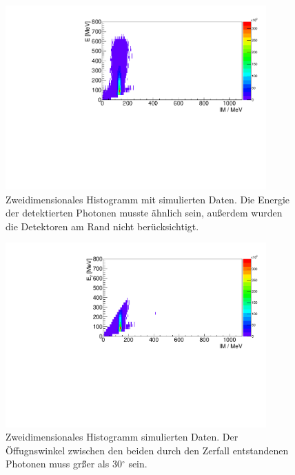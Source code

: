 \documentclass[a4paper,11pt,oneside,final,german,openbib,pdftex]{scrbook}
\begin{document}
{\begin{appendix}
\begin{figure}[h!]
	\begin{center}
		\includegraphics[width=100mm]{NewCalib/20171904Sim30DegreeCut}
		\caption[Simulation: 2D-Hist; Ohne Detektoren am Rand]{Zweidimensionales Histogramm mit simulierten Daten. Die Energie der detektierten Photonen musste \"ahnlich sein, au{\ss}erdem wurden die Detektoren am Rand nicht ber\"ucksichtigt.}
		\label{fig:Sim-Data-2DHist-30-Degree-Edge}
	\end{center}
\end{figure}




\begin{figure}[h!]
	\begin{center}
		\includegraphics[width=100mm]{20170505MinOpeningAngle2DHist}
		\caption[Simulation: 2D-Hist \"Offnugnswinkel muss gr\"{\ss}er als 30$^{\circ}$ sein.]{Zweidimensionales Histogramm simulierten Daten. Der \"Offugnswinkel zwischen den beiden durch den Zerfall entstandenen Photonen muss gr\"{\ss}er als 30$^{\circ}$ sein.}
		\label{fig;2D-Hist-Min-OpeningAngle}
	\end{center}
\end{figure}







\end{appendix}}
\end{document}
